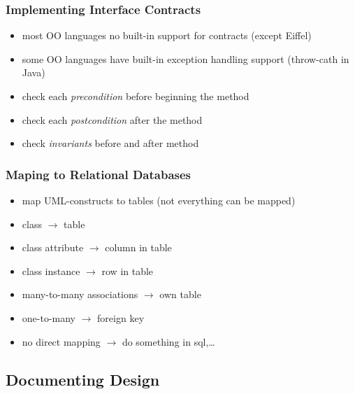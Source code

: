 \documentclass[a4paper, 10pt]{article}
\begin{document}
\subsubsection{Implementing Interface Contracts}
\begin{itemize}
	\item most OO languages no built-in support for contracts (except Eiffel)
	\item some OO languages have built-in exception handling support (throw-cath in Java)
	\item check each \emph{precondition} before beginning the method
	\item check each \emph{postcondition} after the method
	\item check \emph{invariants} before and after method
\end{itemize}

\subsubsection{Maping to Relational Databases}
\begin{itemize}
	\item map UML-constructs to tables (not everything can be mapped)
	\item class $\to$ table
	\item class attribute $\to$ column in table
	\item class instance $\to$ row in table
	\item many-to-many associations $\to$ own table
	\item one-to-many $\to$ foreign key
	\item no direct mapping $\to$ do something in sql,\dots
\end{itemize}

\subsection{Documenting Design}
\end{document}
